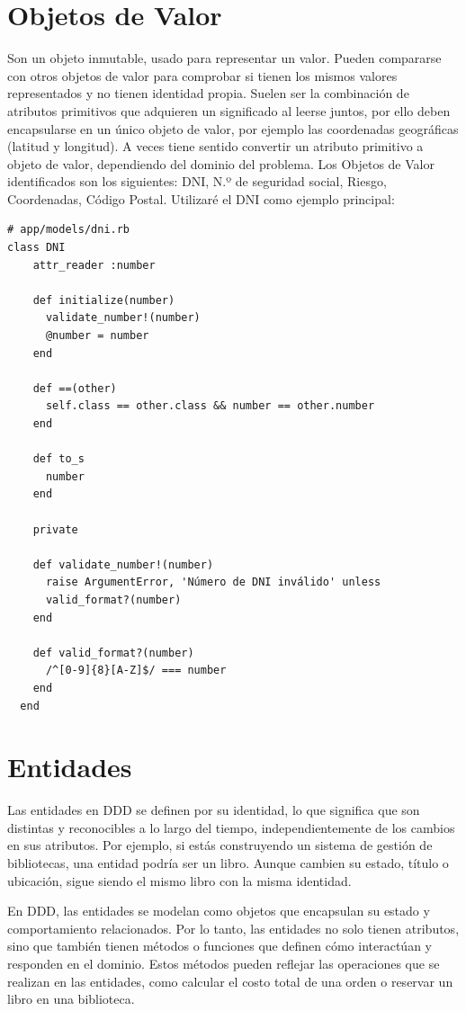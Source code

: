 \section*{Objetos de Valor}
Son un objeto inmutable, usado para representar un valor. Pueden compararse con otros objetos de valor para comprobar 
si tienen los mismos valores representados y no tienen identidad propia. 
Suelen ser la combinación de atributos primitivos que adquieren un significado al leerse juntos, por ello deben encapsularse
en un único objeto de valor, por ejemplo las coordenadas geográficas (latitud y longitud). A veces tiene sentido convertir
un atributo primitivo a objeto de valor, dependiendo del dominio del problema.
Los Objetos de Valor identificados son los siguientes: DNI, N.º de seguridad social, Riesgo, Coordenadas, Código Postal.
Utilizaré el DNI como ejemplo principal: 


\begin{lstlisting}
# app/models/dni.rb
class DNI
    attr_reader :number
  
    def initialize(number)
      validate_number!(number)
      @number = number
    end
  
    def ==(other)
      self.class == other.class && number == other.number
    end
  
    def to_s
      number
    end
  
    private
  
    def validate_number!(number)
      raise ArgumentError, 'Número de DNI inválido' unless 
      valid_format?(number)
    end
  
    def valid_format?(number)
      /^[0-9]{8}[A-Z]$/ === number
    end
  end
\end{lstlisting}

\section*{Entidades}
Las entidades en DDD se definen por su identidad, lo que significa que son distintas y reconocibles a lo largo del tiempo,
independientemente de los cambios en sus atributos. Por ejemplo, si estás construyendo un sistema de gestión de bibliotecas, 
una entidad podría ser un libro. Aunque cambien su estado, título o ubicación, sigue siendo el mismo libro con la misma identidad.

En DDD, las entidades se modelan como objetos que encapsulan su estado y comportamiento relacionados. Por lo tanto, 
las entidades no solo tienen atributos, sino que también tienen métodos o funciones que definen cómo interactúan y 
responden en el dominio. Estos métodos pueden reflejar las operaciones que se realizan en las entidades, como calcular 
el costo total de una orden o reservar un libro en una biblioteca.


